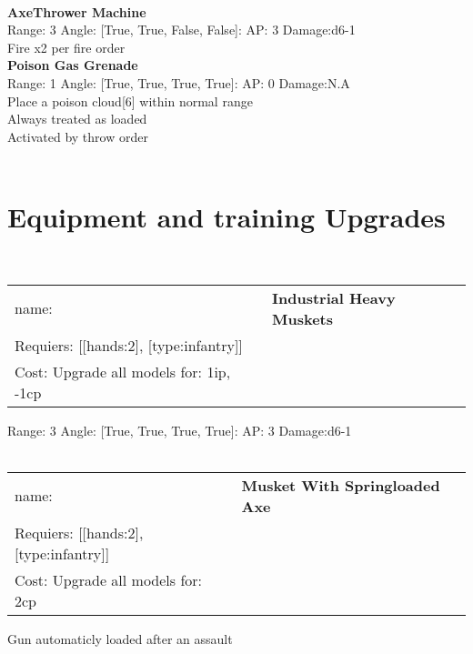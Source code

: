 \ \\
{\bf AxeThrower Machine } \\



Range: 3  Angle: [True, True, False, False]: AP: 3 Damage:d6-1 \\
Fire x2 per fire order\\ 




{\bf Poison Gas Grenade } \\



Range: 1  Angle: [True, True, True, True]: AP: 0 Damage:N.A \\
Place a poison cloud[6] within normal range\\ 
Always treated as loaded\\ 
Activated by throw order\\ 




 
\ \\

\section{Equipment and training Upgrades}\ \\
\begin{tabular}{ll}
name: & {\bf Industrial Heavy Muskets } \\
Requiers: [[hands:2], [type:infantry]] \\
Cost: Upgrade all models for: 1ip, -1cp \\
\end{tabular}



Range: 3  Angle: [True, True, True, True]: AP: 3 Damage:d6-1 \\








\ \\
\begin{tabular}{ll}
name: & {\bf Musket With Springloaded Axe } \\
Requiers: [[hands:2], [type:infantry]] \\
Cost: Upgrade all models for: 2cp \\
\end{tabular}

Gun automaticly loaded after an assault\\ 


